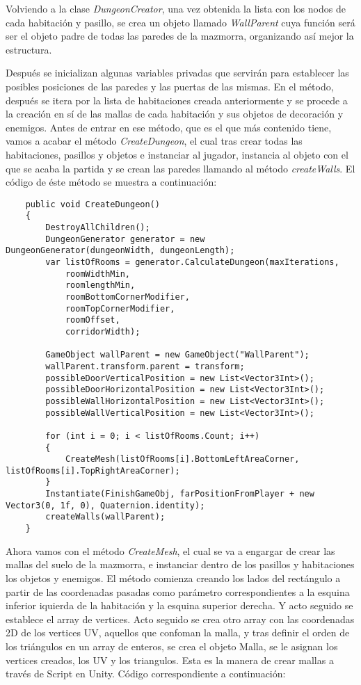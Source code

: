 Volviendo a la clase \textit{DungeonCreator}, una vez obtenida la lista con los nodos de cada habitación y pasillo, se crea un objeto llamado \textit{WallParent} cuya función será ser el objeto padre de todas las paredes de la mazmorra, organizando así mejor la estructura.

Después se inicializan algunas variables privadas que servirán para establecer las posibles posiciones de las paredes y las puertas de las mismas. En el método, después se itera por la lista de habitaciones creada anteriormente y se procede a la creación en sí de las mallas de cada habitación y sus objetos de decoración y enemigos. Antes de entrar en ese método, que es el que más contenido tiene, vamos a acabar el método \textit{CreateDungeon}, el cual tras crear todas las habitaciones, pasillos y objetos e instanciar al jugador, instancia al objeto con el que se acaba la partida y se crean las paredes llamando al método \textit{createWalls}. El código de éste método se muestra a continuación: 

\begin{lstlisting}
    public void CreateDungeon()
    {
        DestroyAllChildren();
        DungeonGenerator generator = new DungeonGenerator(dungeonWidth, dungeonLength);
        var listOfRooms = generator.CalculateDungeon(maxIterations, 
            roomWidthMin, 
            roomlengthMin, 
            roomBottomCornerModifier, 
            roomTopCornerModifier, 
            roomOffset,
            corridorWidth);

        GameObject wallParent = new GameObject("WallParent");
        wallParent.transform.parent = transform;
        possibleDoorVerticalPosition = new List<Vector3Int>();
        possibleDoorHorizontalPosition = new List<Vector3Int>();
        possibleWallHorizontalPosition = new List<Vector3Int>();
        possibleWallVerticalPosition = new List<Vector3Int>();

        for (int i = 0; i < listOfRooms.Count; i++)
        {
            CreateMesh(listOfRooms[i].BottomLeftAreaCorner, listOfRooms[i].TopRightAreaCorner);
        }
        Instantiate(FinishGameObj, farPositionFromPlayer + new Vector3(0, 1f, 0), Quaternion.identity);
        createWalls(wallParent);
    }
\end{lstlisting}

Ahora vamos con el método \textit{CreateMesh}, el cual se va a engargar de crear las mallas del suelo de la mazmorra, e instanciar dentro de los pasillos y habitaciones los objetos y enemigos. El método comienza creando los lados del rectángulo a partir de las coordenadas pasadas como parámetro correspondientes a la esquina inferior iquierda de la habitación y la esquina superior derecha. Y acto seguido se establece el array de vertices. Acto seguido se crea otro array con las coordenadas 2D de los vertices UV, aquellos que confoman la malla, y tras definir el orden de los triángulos en un array de enteros, se crea el objeto Malla, se le asignan los vertices creados, los UV y los triangulos. Esta es la manera de crear mallas a través de Script en Unity. Código correspondiente a continuación:

